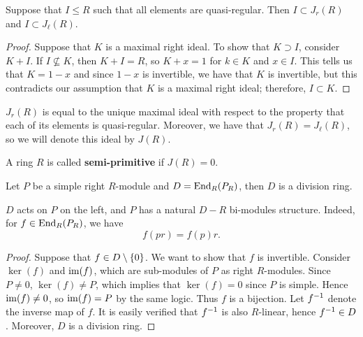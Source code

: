 \begin{lemma}\label{1.21}
Suppose that $I\leq R$ such that all elements are quasi-regular. Then $I \subset J_r(R)$ and $I \subset J_{\ell}(R).$
\end{lemma}
\begin{proof}
Suppose that $K$ is a maximal right ideal. To show that $K \supset I$, consider $K+I$. If $I\nsubseteq K$, then $K+I = R$, so $K+x = 1$ for $k\in K$ and $x \in I$. This tells us that $K = 1-x$ and since $1-x$ is invertible, we have that $K$ is invertible, but this contradicts our assumption that $K$ is a maximal right ideal; therefore, $I \subset K$.
\end{proof}

\begin{coro}\label{1.22}
$J_r(R)$ is equal to the unique maximal ideal with respect to the property that each of its elements is quasi-regular. Moreover, we have that $J_r(R) = J_{\ell}(R)$, so we will denote this ideal by $J(R).$
\end{coro}

\begin{defn}\label{1.23}
A ring $R$ is called \textbf{semi-primitive} if $J(R) = 0$.
\end{defn}

\begin{theorem}\label{1.24}
Let $P$ be a simple right $R$-module and $D = \operatorname{End}_R(P_R)$, then $D$ is a division ring.
\end{theorem}

\begin{remark}\label{1.25}
$D$ acts on $P$ on the left, and $P$ has a natural $D-R$ bi-modules structure. Indeed, for $f \in \operatorname{End}_R(P_R)$, we have 
$$f(pr) = f(p)r.$$
\end{remark}

\begin{proof}
Suppose that $f \in D\setminus \left\lbrace 0 \right\rbrace$. We want to show that $f$ is invertible. Consider $\ker (f)$ and $\operatorname{im} (f)$, which are sub-modules of $P$ as right $R$-modules. Since $P\neq 0$, $\ker (f) \neq P$, which implies that $\ker (f) = 0$ since $P$ is simple. Hence $\operatorname{im} (f)\neq 0$, so $\operatorname{im} (f) = P$ by the same logic. Thus $f$ is a bijection. Let $f^{-1}$ denote the inverse map of $f$. It is easily verified that $f^{-1}$ is also $R$-linear, hence $f^{-1} \in D$. Moreover, $D$ is a division ring.
\end{proof}

